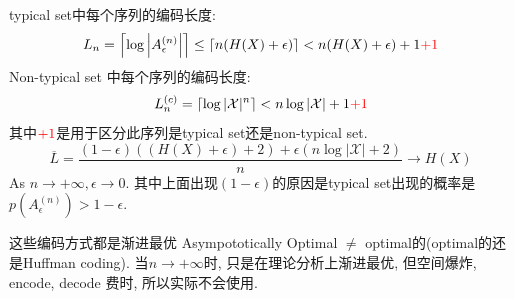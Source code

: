 typical set中每个序列的编码长度:
$$L_n = \left\lceil\log\left|A_{\epsilon}^{(n)}\right|\right\rceil \leq \left\lceil n(H(X)+\epsilon)\right\rceil<n(H(X)+\epsilon)+1\textcolor{red}{+1}$$
Non-typical set 中每个序列的编码长度:
$$L_n^{(c)}=\left\lceil\log |\mathcal{X}|^n\right\rceil < n\log|\mathcal{X}| +1 \textcolor{red}{+1}$$
其中$\textcolor{red}{+1}$是用于区分此序列是typical set还是non-typical set.
$$\overline{L}=\dfrac{\left(1-\epsilon\right)\left(\left(H(X)+\epsilon\right)+2\right)+\epsilon\left(n
\log|\mathcal{X}|+2\right)}{n}\to H(X)$$
As $n\to+\infty,\epsilon\to 0$. 其中上面出现$(1-\epsilon)$的原因是typical set出现的概率是$p(A_{\epsilon}^{(n)})>1-\epsilon$.

这些编码方式都是渐进最优 Asympototically Optimal $\neq$ optimal的(optimal的还是Huffman coding). 当$n\to+\infty$时, 只是在理论分析上渐进最优, 但空间爆炸, encode, decode 费时, 所以实际不会使用.